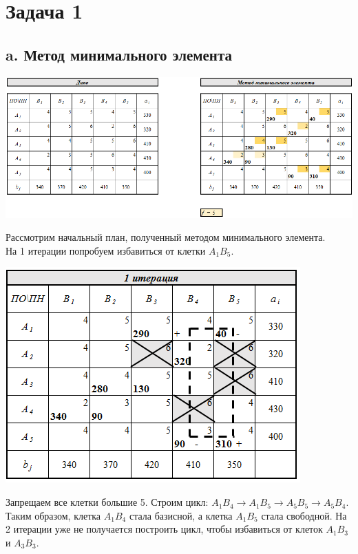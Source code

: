 \documentclass[14pt,a4paper,fleqn]{extarticle}
\begin{document}
\section*{Задача 1}
\subsection*{a. Метод минимального элемента}
\begin{center}
	\includegraphics[scale=0.51]{1}
\end{center}
\small Рассмотрим начальный план, полученный методом минимального элемента.\\
На 1 итерации попробуем избавиться от клетки $A_1B_5$.
\begin{center}
	\includegraphics[scale=0.64]{2}
\end{center}
Запрещаем все клетки большие 5. Строим цикл: $A_1B_4 \rightarrow A_1B_5 \rightarrow A_5B_5 \rightarrow A_5B_4$.\\
Таким образом, клетка $A_1B_4$ стала базисной, а клетка $A_1B_5$ стала свободной.
\newpage
На 2 итерации уже не получается построить цикл, чтобы избавиться от клеток $A_1B_3$ и $A_3B_3$.
\end{document}
